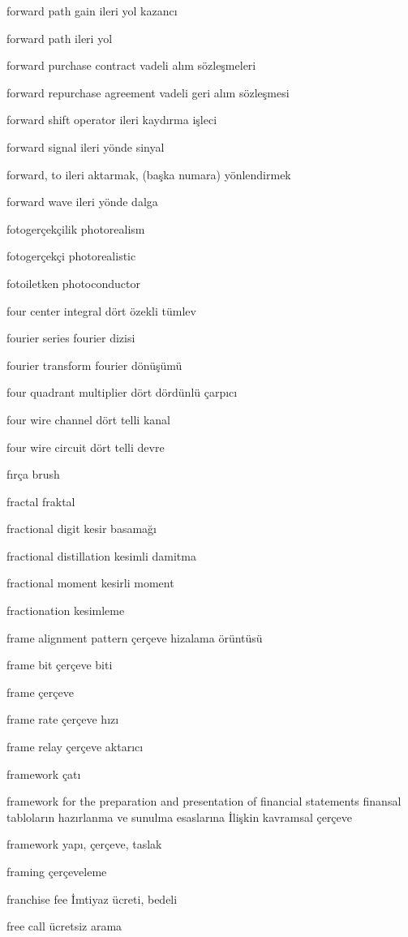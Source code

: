 \documentclass[12pt,fleqn]{article}\usepackage{../../common}
\begin{document}
forward path gain ileri yol kazancı

forward path ileri yol

forward purchase contract vadeli alım sözleşmeleri

forward repurchase agreement vadeli geri alım sözleşmesi

forward shift operator ileri kaydırma işleci

forward signal ileri yönde sinyal

forward, to ileri aktarmak, (başka numara) yönlendirmek

forward wave ileri yönde dalga

fotogerçekçilik photorealism

fotogerçekçi photorealistic

fotoiletken photoconductor

four center integral dört özekli tümlev

fourier series fourier dizisi

fourier transform fourier dönüşümü

four quadrant multiplier dört dördünlü çarpıcı

four wire channel dört telli kanal

four wire circuit dört telli devre

fırça brush

fractal fraktal

fractional digit kesir basamağı

fractional distillation kesimli damitma

fractional moment kesirli moment

fractionation kesimleme

frame alignment pattern çerçeve hizalama örüntüsü

frame bit çerçeve biti

frame çerçeve

frame rate çerçeve hızı

frame relay çerçeve aktarıcı

framework çatı

framework for the preparation and presentation of financial statements finansal tabloların hazırlanma ve sunulma esaslarına İlişkin kavramsal çerçeve

framework yapı, çerçeve, taslak

framing çerçeveleme

franchise fee İmtiyaz ücreti, bedeli

free call ücretsiz arama
\end{document}

